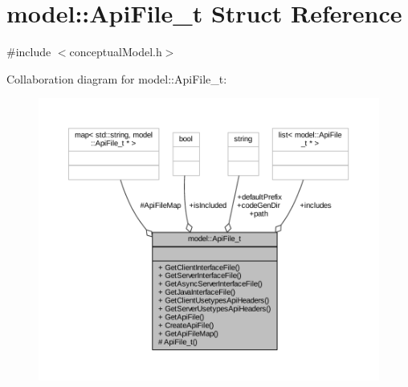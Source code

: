 \hypertarget{structmodel_1_1_api_file__t}{}\section{model\+:\+:Api\+File\+\_\+t Struct Reference}
\label{structmodel_1_1_api_file__t}


{\ttfamily \#include $<$conceptual\+Model.\+h$>$}



Collaboration diagram for model\+:\+:Api\+File\+\_\+t\+:
\nopagebreak
\begin{figure}[H]
\begin{center}
\leavevmode
\includegraphics[width=350pt]{structmodel_1_1_api_file__t__coll__graph}
\end{center}
\end{figure}
